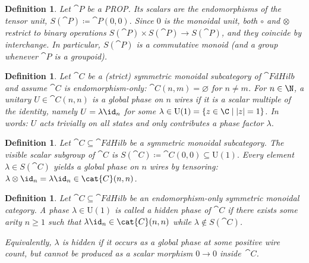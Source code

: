 \documentclass[10pt,a4paper]{article}
\newtheorem{definition}[theorem]{Definition}
\begin{document}

\begin{definition}\label{def:scalar-in-prop}
Let $\cat{P}$ be a PROP. Its \emph{scalars} are the endomorphisms of the tensor unit,
\(
  S(\cat{P}) \coloneqq \cat{P}(0,0).
\)
Since $0$ is the monoidal unit, both $\circ$ and $\otimes$ restrict to binary operations
\(
  S(\cat{P})\times S(\cat{P})\to S(\cat{P})
\),
and they coincide by interchange.  In particular, $S(\cat{P})$ is a commutative monoid
(and a group whenever $\cat{P}$ is a groupoid).
\end{definition}

\begin{definition}\label{def:global-phase}
Let $ \cat{C}$ be a (strict) symmetric monoidal subcategory of $\cat{FdHilb}$ and assume
$ \cat{C}$ is \emph{endomorphism-only}:
$ \cat{C}(n,m)=\varnothing$ for $n\neq m$.  For $n\in\N$, a unitary
$U\in \cat{C}(n,n)$ is a \emph{global phase on $n$ wires} if it is a scalar multiple of
the identity, namely \(U=\lambda \id_n\) for some
\(\lambda\in\mathrm{U}(1)=\{z\in\C\mid |z|=1\}\).
In words: $U$ acts trivially on all states and only contributes a phase factor $\lambda$.
\end{definition}

\begin{definition}\label{def:visible-scalars}
Let $ \cat{C}\subseteq \cat{FdHilb}$ be a symmetric monoidal subcategory.
The \emph{visible scalar subgroup} of $ \cat{C}$ is
\(
  S( \cat{C}) \coloneqq  \cat{C}(0,0)\subseteq\mathrm{U}(1).
\)
Every element $\lambda\in S( \cat{C})$ yields a global phase on $n$ wires by tensoring:
$\lambda\otimes \id_n = \lambda \id_n\in  \cat{C}(n,n)$.
\end{definition}

\begin{definition}\label{def:hidden-phase}
Let $ \cat{C}\subseteq \cat{FdHilb}$ be an endomorphism-only symmetric monoidal category.
A phase $\lambda\in\mathrm{U}(1)$ is called a \emph{hidden phase of $ \cat{C}$} if there
exists some arity $n\ge 1$ such that $\lambda \id_n\in \cat{C}(n,n)$ while
$\lambda\notin S( \cat{C})$.

Equivalently, $\lambda$ is hidden if it occurs as a global phase at some positive wire count,
but cannot be produced as a scalar morphism $0\to 0$ inside~$ \cat{C}$.
\end{definition}
\end{document}
